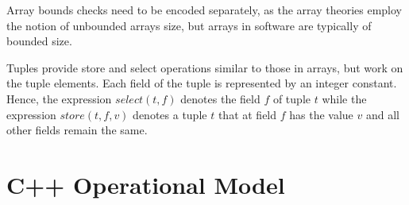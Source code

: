 \documentclass[conference]{IEEEtran}
\begin{document}
\noindent
Array bounds checks need to be encoded separately, as the array theories
employ the notion of unbounded arrays size, but arrays in software are
typically of bounded size.


Tuples %
provide
\mbox{store} and \mbox{select} operations similar to those in arrays, but work
on the tuple \mbox{elements}. Each field of the tuple is represented by an
integer constant. Hence, the expression $\mathit{select}(t, f)$ denotes the field $f$
of tuple $t$ while the expression $\mathit{store}(t, f, v)$ denotes a tuple $t$
that at field $f$ has the value $v$ and all other fields remain the
same.

\section{C++ Operational Model}
\label{cpp-operational-model}

\end{document}
